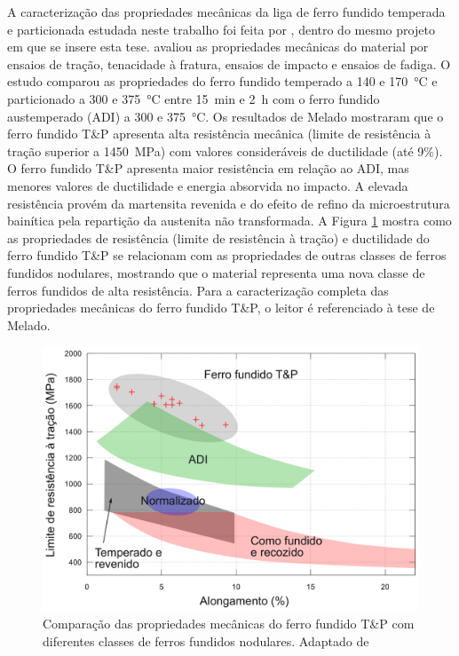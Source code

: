 A caracterização das propriedades mecânicas da liga de ferro fundido temperada e particionada estudada neste trabalho foi feita por , dentro do mesmo projeto em que se insere esta tese.  avaliou as propriedades mecânicas do material por ensaios de tração, tenacidade à fratura, ensaios de impacto e ensaios de fadiga. O estudo comparou as propriedades do ferro fundido temperado a 140 e \SI{170}{\degreeCelsius} e particionado a 300 e \SI{375}{\degreeCelsius} entre 15~min e 2~h com o ferro fundido austemperado (ADI) a 300 e \SI{375}{\degreeCelsius}. Os resultados de Melado mostraram que o ferro fundido T\&P apresenta alta resistência mecânica (limite de resistência à tração superior a \SI{1450}{MPa}) com valores consideráveis de ductilidade (até 9\%). O ferro fundido T\&P apresenta maior resistência em relação ao ADI, mas menores valores de ductilidade e energia absorvida no impacto. A elevada resistência provém da martensita revenida e do efeito de refino da microestrutura bainítica pela repartição da austenita não transformada. A Figura \ref{fig:banana_plot} mostra como as propriedades de resistência (limite de resistência à tração) e ductilidade do ferro fundido T\&P se relacionam com as propriedades de outras classes de ferros fundidos nodulares, mostrando que o material representa uma nova classe de ferros fundidos de alta resistência. Para a caracterização completa das propriedades mecânicas do ferro fundido T\&P, o leitor é referenciado à tese de Melado\cite{Melado2018}.

\begin{figure}
  \includegraphics[width=\textwidth]{img/banana_plot-pt.pdf}
  \caption{Comparação das propriedades mecânicas do ferro fundido T\&P com diferentes classes de ferros fundidos nodulares. Adaptado de \cite{Melado2018}}
  \label{fig:banana_plot}
\end{figure}